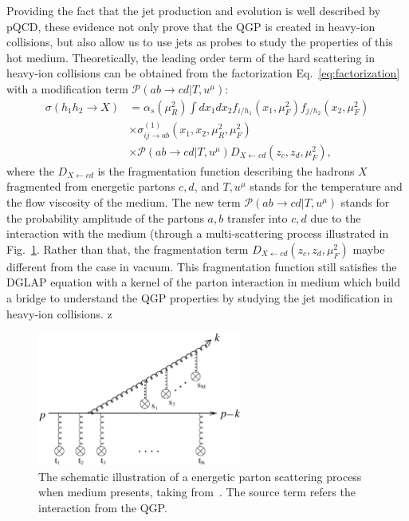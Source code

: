 Providing the fact that the jet production and evolution is well described by pQCD, these evidence not only prove that the QGP is created in heavy-ion collisions, but also allow us to use jets as probes to study the properties of this hot medium. Theoretically, the leading order term of the hard scattering in heavy-ion collisions can be obtained from the factorization Eq.~\ref{eq:factorization} with a modification term $\mathcal{P}(ab\to cd|T,u^\mu)$:
\begin{equation}
\begin{aligned}
  \sigma(h_1h_2\to X)&=\alpha_s(\mu_R^2)\int dx_1dx_2f_{i/h_1}(x_1,\mu^2_F)f_{j/h_2}(x_2,\mu^2_F)\\
&\times\sigma^{(1)}_{ij\to ab}(x_1,x_2,\mu^2_R, \mu^2_F)\\
&\times\mathcal{P}(ab\to cd|T,u^\mu)D_{X\leftarrow cd}(z_c,z_d,\mu^2_F),
\end{aligned}
\end{equation}
where the $D_{X\leftarrow cd}$ is the fragmentation function describing the hadrons $X$ fragmented from energetic partons $c,d$, and $T,u^\mu$ stands for the temperature and the flow viscosity of the medium. The new term $\mathcal{P}(ab\to cd|T,u^\mu)$ stands for the probability amplitude of the partons $a,b$ transfer into $c,d$ due to the interaction with the medium (through a multi-scattering process illustrated in Fig.~\ref{fig:multi_scattering_in_medium}. Rather than that, the fragmentation term $D_{X\leftarrow cd}(z_c,z_d,\mu^2_F)$ maybe different from the case in vacuum. This fragmentation function still satisfies the DGLAP equation with a kernel of the parton interaction in medium which build a bridge to understand the QGP properties by studying the jet modification in heavy-ion collisions. z

\begin{figure}[ht]
  \begin{center}
    \includegraphics[width=0.6\textwidth]{figures/introduction/multi_scattering_in_medium.eps}
  \end{center}
  \caption{The schematic illustration of a energetic parton scattering process when medium presents, taking from~\cite{Jeon:2009yv}. The source term refers the interaction from the QGP.}
  \label{fig:multi_scattering_in_medium}
\end{figure}

